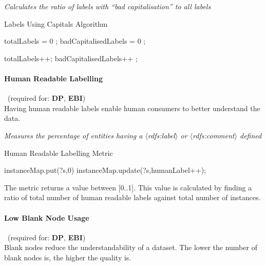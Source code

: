 \begin{mdframed}[style=metricdefinition]
\emph{Calculates the ratio of labels with ``bad capitalisation'' to all labels}
\end{mdframed}

\begin{algorithm}
\caption{Labels Using Capitals Algorithm}\label{lst:badCapitals}
\begin{algorithmic}[1]
\State totalLabels = 0 ;
\State badCapitalisedLabels = 0 ;
\EndProcedure

 totalLabels++; \EndIf
{} badCapitalisedLabels++ ; \EndIf
\EndProcedure
\end{algorithmic}
\end{algorithm}

\paragraph{Human Readable Labelling}~(required for: \textbf{DP}, \textbf{EBI})~\\
Having human readable labels enable human consumers to better understand the data.

\begin{mdframed}[style=metricdefinition]
\emph{Measures the percentage of entities having a $\langle$rdfs:label$\rangle$ or $\langle$rdfs:comment$\rangle$ defined}
\end{mdframed}

\begin{algorithm}
\caption{Human Readable Labelling Metric}
\begin{algorithmic}[1]
 instanceMap.put(?s,0) \EndIf
{} instanceMap.update(?s,humanLabel++);   \EndIf 
\EndProcedure
\end{algorithmic}
\end{algorithm}

The metric returns a value between [0..1]. This value is calculated by finding a ratio of total number of human readable labels against total number of instances.

\paragraph{Low Blank Node Usage}~(required for: \textbf{DP}, \textbf{EBI})~\\
Blank nodes reduce the understandability of a dataset.
The lower the number of blank nodes is, the higher the quality is.

